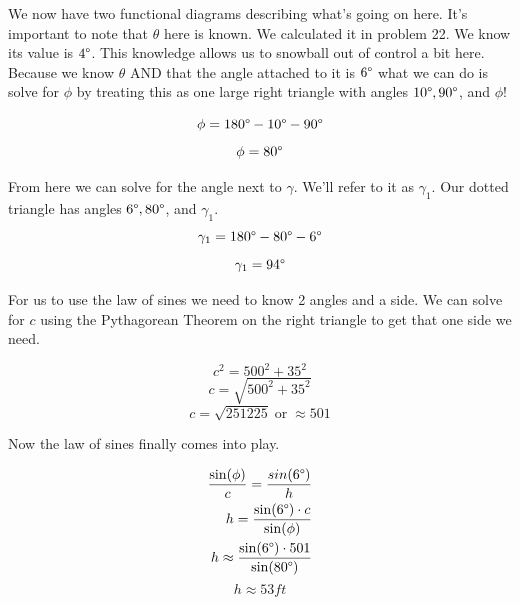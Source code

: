 \begin{solution}
    We now have two functional diagrams describing what's going on here. It's important to note that $\theta$ here is known. We calculated it in problem 22. We know its value is $4\degree$. This knowledge allows us to snowball out of control a bit here. Because we know $\theta$ AND that the angle attached to it is $6\degree$ what we can do is solve for $\phi$ by treating this as one large right triangle with angles $10\degree, 90\degree$, and $\phi$!
    
    \[\phi = 180\degree - 10\degree - 90\degree\]
    \[\phi = 80\degree\]
    
    From here we can solve for the angle next to $\gamma$. We'll refer to it as $\gamma_1$. Our dotted triangle has angles $6\degree, 80\degree$, and $\gamma_1$.
    \[\gamma_1 = 180\degree - 80\degree - 6\degree\]
    \[\gamma_1 = 94\degree\]
    
    For us to use the law of sines we need to know 2 angles and a side. We can solve for $c$ using the Pythagorean Theorem on the right triangle to get that one side we need. 
    
    \[c^2 = 500^2 + 35^2\]
    \[c = \sqrt{500^2 + 35^2}\]
    \[c = \sqrt{251225} \; \text{or} \; \approx 501\]
    
    Now the law of sines finally comes into play. 
    
    \begin{align}
        \frac{\sin(\phi)}{c} = \frac{sin(6\degree)}{h} \\
        h = \frac{\sin(6\degree) \cdot c}{\sin(\phi)} \\
        h \approx \frac{\sin(6\degree) \cdot 501}{\sin(80\degree)}
    \end{align}
    \[\boxed{h \approx 53ft}\]
\end{solution}